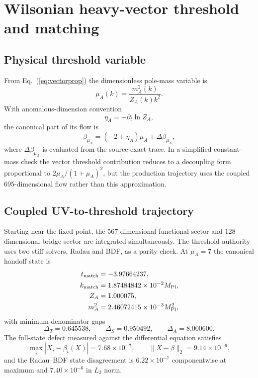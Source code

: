 \documentclass[12pt]{iopart}
\newcommand{\mpl}{M_{\rm Pl}}
\begin{document}
\section{Wilsonian heavy-vector threshold and matching}
\label{sec:wilson}

\subsection{Physical threshold variable}

From Eq.~(\ref{eq:vectorprop}) the dimensionless pole-mass variable is
\begin{equation}
\mu_A(k)=\frac{m_A^2(k)}{Z_A(k)k^2}.
\label{eq:mu}
\end{equation}
With anomalous-dimension convention
\begin{equation}
\eta_A=-\partial_t\ln Z_A,
\end{equation}
the canonical part of its flow is
\begin{equation}
\beta_{\mu_A}=(-2+\eta_A)\mu_A+\Delta\beta_{\mu_A},
\label{eq:betamu}
\end{equation}
where $\Delta\beta_{\mu_A}$ is evaluated from the source-exact trace.  In a simplified constant-mass check the vector threshold contribution reduces to a decoupling form proportional to $2\mu_A/(1+\mu_A)^2$, but the production trajectory uses the coupled 695-dimensional flow rather than this approximation.

\subsection{Coupled UV-to-threshold trajectory}

Starting near the fixed point, the 567-dimensional functional sector and 128-dimensional bridge sector are integrated simultaneously.  The threshold authority uses two stiff solvers, Radau and BDF, as a parity check.  At $\mu_A=7$ the canonical handoff state is
\begin{align}
 t_{\rm match}&=-3.97664237,\\
 k_{\rm match}&=1.87484842\times10^{-2}\mpl,\\
 Z_A&=1.000075,\\
 m_A^2&=2.46072415\times10^{-3}\mpl^2,
\end{align}
with minimum denominator gaps
\begin{equation}
\Delta_T=0.645538,\qquad \Delta_S=0.950492,\qquad \Delta_A=8.000600.
\end{equation}
The full-state defect measured against the differential equation satisfies
\begin{equation}
\max_i|\dot X_i-\beta_i(X)|=7.68\times10^{-7},\qquad
\|\dot X-\beta\|_2=9.14\times10^{-6},
\end{equation}
and the Radau--BDF state disagreement is $6.22\times10^{-7}$ componentwise at maximum and $7.40\times10^{-6}$ in $L_2$ norm.
\end{document}
